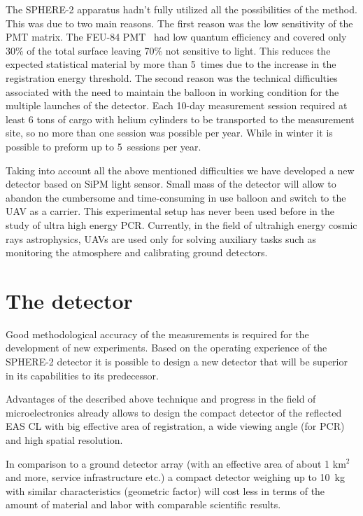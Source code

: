 \documentclass[a4paper,11pt]{article}
\begin{document}
The SPHERE-2 apparatus hadn't fully utilized all the possibilities of the method.
This was due to two main reasons. 
The first reason was the low sensitivity of the PMT matrix. The FEU-84 PMT~\cite{FEU84} had low quantum efficiency and covered only 30\% of the total surface leaving 70\% not sensitive to light. This reduces the expected statistical material by more than 5~times due to the increase in the registration energy threshold. The second reason was the technical difficulties associated with the need to maintain the balloon in working condition for the multiple launches of the detector. Each 10-day measurement session required at least 6 tons of cargo with helium cylinders to be transported to the measurement site, so no more than one session was possible per year. While in winter it is possible to preform up to 5~sessions per year.

Taking into account all the above mentioned difficulties we have developed a new detector based on SiPM light sensor.
Small mass of the detector will allow to abandon the cumbersome and time-consuming in use balloon and switch to the UAV as a carrier.
This experimental setup has never been used before in the study of ultra high energy PCR.
Currently, in the field of ultrahigh energy cosmic rays astrophysics, UAVs are used only for solving auxiliary tasks such as monitoring the atmosphere and calibrating ground detectors.


\section{The detector}

Good methodological accuracy of the measurements is required for the development of new experiments. 
Based on the operating experience of the SPHERE-2 detector it is possible to design a new detector that will be superior in its capabilities to its predecessor.

Advantages of the described above technique and progress in the field of microelectronics already allows to design the compact detector of the reflected EAS CL with big effective area of registration, a wide viewing angle (for PCR) and high spatial resolution. 

In comparison to a ground detector array (with an effective area of about 1 km$^2$ and more, service infrastructure etc.) a compact detector weighing up to 10~kg with similar characteristics (geometric factor) will cost less in terms of the amount of material and labor with comparable scientific results.
\end{document}
